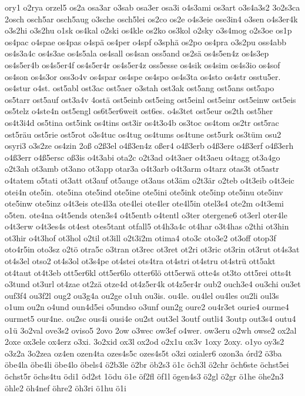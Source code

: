 {ory1
o2rya
orzel5
os2a
osa3ar
o3sab
osa3er
osa3i
o4s3ami
os3art
o3s4a3s2
3o2s3ca
2osch
osch5ar
osch5aug
o3sche
osch5lei
os2co
os2e
o4s3eie
ose3in4
o3sen
o4s3er4k
o3s2hi
o3s2hu
o1sk
os4kal
o2ski
os4kle
os2ko
os3kol
o2sky
o3s4mog
o2s3oe
os1p
os4pac
o4spae
os4pas
o4spä
os4per
o4spf
o3sphä
os2po
os4pra
o3s2pu
oss4abb
os4s3a4c
os4s3ae
os4s5ala
os4sall
os4san
oss5and
os2sä
os4s5en4z
os4s3ep
os4s5er4b
os4s5er4f
os4s5er4r
os4s5er4z
oss5esse
os4sik
os4sim
os4s3io
os4sof
os4son
os4s3or
oss3o4v
os4spar
os4spe
os4spo
os4s3ta
os4sto
os4str
osstu5er.
os4stur
o4st.
ost5abl
ost3ac
ost5aer
o3stah
ost3ak
ost5ang
ost5ans
ost5apo
os5tarr
ost5auf
ost3a4v
4ostä
ost5einb
ost5eing
ost5einl
ost5einr
ost5einw
ost5eis
os5telz
o4ste4n
ost5engl
os6t5er6weit
ost6es.
o4s3tet
ost5eur
os2th
ost5her
os4t3i4d
os5tina
ost5ink
os4tins
ost3ir
os4t3o4b
os3toc
os4tom
os2tr
ost5rac
ost5räu
ost5rie
ost5rot
o3s4tuc
os4tug
os4tums
os4tune
ost5urk
os3tüm
osu2
osyri3
o3s2ze
os4zin
2oß
o2ß3el
o4ß3en4z
oßer4
o4ß3erb
o4ß3ere
o4ß3erf
o4ß3erh
o4ß3err
o4ß5ersc
oß3is
o4t3abi
ota2c
o2t3ad
o4t3aer
o4t3aeu
o4tagg
ot3a4go
o2t3ah
ot3amb
ot3ano
ot3app
otar3a
o4t3arb
o4t3arm
o4tarz
otas3t
ot5astr
o4tatem
o5tati
ot3att
ot3auf
ot5auge
ot3aus
ot3äm
o2t3är
o2teb
o4t3eib
o4t3eic
otei4n
ote5in.
ote5ina
ote5ind
ote5ine
ote5ini
ote5ink
ote5inp
ote5inu
ote5inv
ote5inw
ote5inz
o4t3eis
ote4l3a
ote4lei
ote4ler
ote4l5in
otel3s4
ote2m
o4t3emi
o5ten.
ote4na
o4t5ends
oten3s4
o4t5entb
o4tentl
o3ter
otergene6
ot3erl
oter4le
o4t3erw
o4t3es4s
ot4est
otes5tant
otfall5
ot4h3a4c
ot4har
o3t4has
o2thi
ot3hin
ot3hir
o4t3hof
ot3hol
o2til
ot3ill
o2t3i2m
otima4
oto3c
oto3e2
ot3off
otop3f
oto4r5in
oto3sz
o2tö
otra5c
o3tran
ot3rec
ot3ret
ot2ri
ot3ric
ot3rin
ot3rut
ot4s3at
ot4s3el
otso2
ot4s3ol
ot3s4pe
ot4stei
ots4tra
ot4stri
ot4stru
ot4strü
ott5akt
ot4taut
ot4t3eb
ott5er6kl
ott5er6lo
otter6lö
ott5erwä
otte4s
ot3to
ott5rei
otts4t
o3tund
ot3url
ot4zae
ot2zä
otze4d
ot4z5er4k
ot4z5er4r
oub2
ouch3e4
ou3chi
ou3et
ouf3f4
ou3f2l
oug2
ou3g4a
ou2ge
o1uh
ou3is.
ou4le.
ou4lel
ou4les
ou2li
oul3s
o1um
ou2n
o4und
oun4d5ei
o5undso
o3unf
oun2g
oure2
ou4r3et
ourie4
ourme4
ourmet5
our4ne.
ou2sc
ous4i
ousi4e
ou2st
out3el
3outf
outli4
3outp
out3s4
outu4
o1ü
3o2val
ove3s2
oviso5
2ovo
2ow
o3wec
ow3ef
o4wer.
ow3eru
o2wh
owse2
ox2al
2oxe
ox3ele
ox4erz
o3xi.
3o2xid
ox3l
ox2od
o2x1u
ox3v
1oxy
2oxy.
o1yo
oy3s2
o3z2a
3o2zea
oz4en
ozen4ta
ozes4s5c
ozes4s5t
o3zi
ozialer6
ozon3a
órd2
ö3ba
öbe4la
öbe4li
öbe4lo
öbels4
ö2b3le
ö2br
öb2s3
ö1c
öch3l
ö2chr
öch6ste
öchst5ei
öchst5r
öchs4tu
ödi1
öd2st
1ödu
ö1e
öf2fl
öf1l
ögen4s3
ö2gl
ö2gr
ö1he
öhe2n3
öhle2
öh4nef
öhre2
öh3ri
ö1hu
ö1i
}
